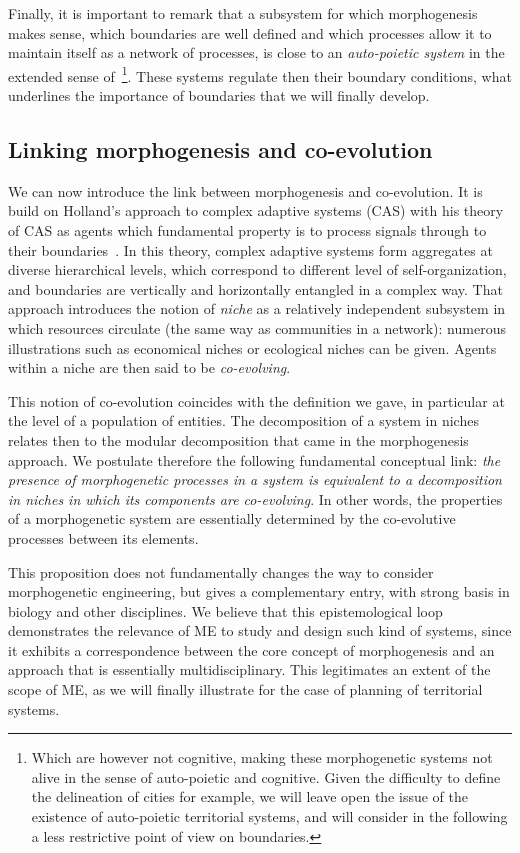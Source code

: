 \documentclass[letterpaper]{article}
\begin{document}
Finally, it is important to remark that a subsystem for which morphogenesis makes sense, which boundaries are well defined and which processes allow it to maintain itself as a network of processes, is close to an \emph{auto-poietic system} in the extended sense of~\cite{bourgine2004autopoiesis}\footnote{Which are however not cognitive, making these morphogenetic systems not alive in the sense of auto-poietic and cognitive. Given the difficulty to define the delineation of cities for example, we will leave open the issue of the existence of auto-poietic territorial systems, and will consider in the following a less restrictive point of view on boundaries.}. These systems regulate then their boundary conditions, what underlines the importance of boundaries that we will finally develop.


\subsection{Linking morphogenesis and co-evolution}


We can now introduce the link between morphogenesis and co-evolution. It is build on Holland's approach to complex adaptive systems (CAS) with his theory of CAS as agents which fundamental property is to process signals through to their boundaries~\citep{holland2012signals}. In this theory, complex adaptive systems form aggregates at diverse hierarchical levels, which correspond to different level of self-organization, and boundaries are vertically and horizontally entangled in a complex way. That approach introduces the notion of \emph{niche} as a relatively independent subsystem in which resources circulate (the same way as communities in a network): numerous illustrations such as economical niches or ecological niches can be given. Agents within a niche are then said to be \emph{co-evolving}.


This notion of co-evolution coincides with the definition we gave, in particular at the level of a population of entities. The decomposition of a system in niches relates then to the modular decomposition that came in the morphogenesis approach. We postulate therefore the following fundamental conceptual link: \emph{the presence of morphogenetic processes in a system is equivalent to a decomposition in niches in which its components are co-evolving}. In other words, the properties of a morphogenetic system are essentially determined by the co-evolutive processes between its elements.

This proposition does not fundamentally changes the way to consider morphogenetic engineering, but gives a complementary entry, with strong basis in biology and other disciplines. We believe that this epistemological loop demonstrates the relevance of ME to study and design such kind of systems, since it exhibits a correspondence between the core concept of morphogenesis and an approach that is essentially multidisciplinary. This legitimates an extent of the scope of ME, as we will finally illustrate for the case of planning of territorial systems.
\end{document}
